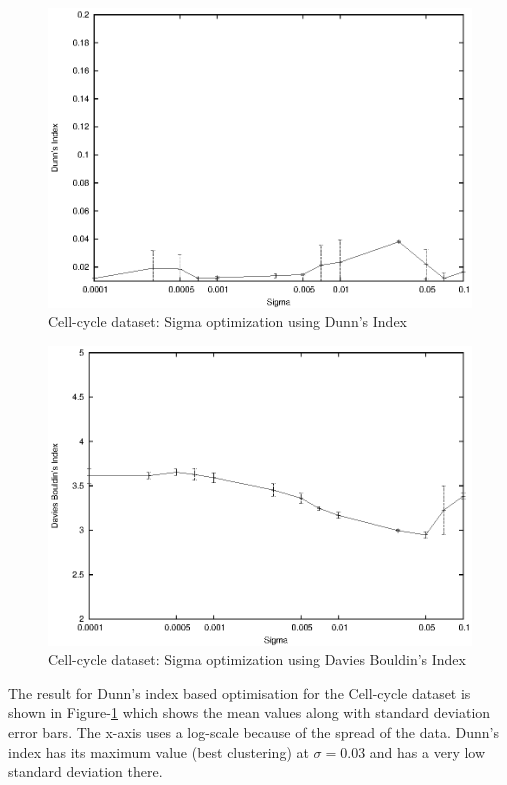 \begin{figure}[p]
 \centering
 \includegraphics[scale=1.0]{images_only/semisup/results/plots/ccycle_dunn.eps}
 \caption{Cell-cycle dataset: Sigma optimization using Dunn's Index}
 \label{fig:ccycle_sigma_opt_dunn}
\end{figure}

\begin{figure}[p]
 \centering
 \includegraphics[scale=1.0]{images_only/semisup/results/plots/ccycle_davies.eps}
 \caption{Cell-cycle dataset: Sigma optimization using Davies Bouldin's Index}
 \label{fig:ccycle_sigma_opt_dav}
\end{figure}

The result for Dunn's index based optimisation for the Cell-cycle dataset is shown in Figure-\ref{fig:ccycle_sigma_opt_dunn} which shows the mean values along with standard deviation error bars. 
The x-axis uses a log-scale because of the spread of the data.  Dunn's index has its maximum value (best clustering) at $\sigma=0.03$ and has a very low standard deviation there. 

